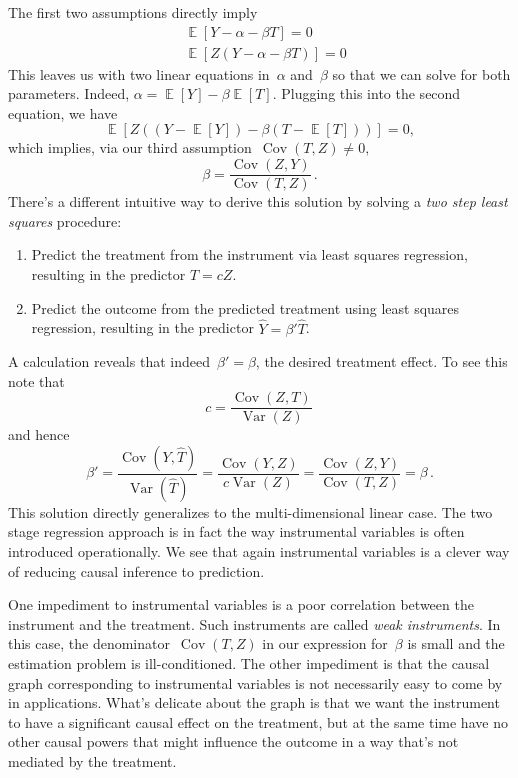 \documentclass{tufte-book}
\begin{document}
The first two assumptions directly imply \[
\begin{aligned}
& \mathop\mathbb{E}[Y-\alpha-\beta T]= 0 \\
& \mathop\mathbb{E}[Z(Y-\alpha-\beta T)] = 0
\end{aligned}
\] This leaves us with two linear equations in~\(\alpha\) and~\(\beta\)
so that we can solve for both parameters. Indeed,
\(\alpha=\mathop\mathbb{E}[Y]-\beta\mathop\mathbb{E}[T]\). Plugging this
into the second equation, we have \[
\mathop\mathbb{E}[Z((Y-\mathop\mathbb{E}[Y])-\beta(T-\mathop\mathbb{E}[T]) )]=0,
\] which implies, via our third
assumption~\(\mathop\mathrm{Cov}(T, Z)\ne 0,\) \[
\beta = \frac{\mathop\mathrm{Cov}(Z, Y)}{\mathop\mathrm{Cov}(T, Z)}\,.
\] There's a different intuitive way to derive this solution by solving
a \emph{two step least squares} procedure:

\begin{enumerate}
\def\labelenumi{\arabic{enumi}.}
\tightlist
\item
  Predict the treatment from the instrument via least squares
  regression, resulting in the predictor \(\hat T = cZ\).
\item
  Predict the outcome from the predicted treatment using least squares
  regression, resulting in the predictor \(\hat Y=\beta' \hat T\).
\end{enumerate}

A calculation reveals that indeed~\(\beta'=\beta\), the desired
treatment effect. To see this note that \[
c=\frac{\mathop\mathrm{Cov}(Z, T)}{\mathop\mathrm{Var}(Z)}\,
\] and hence \[
\beta'
= \frac{\mathop\mathrm{Cov}(Y, \hat T)}{\mathop\mathrm{Var}(\hat T)}
= \frac{\mathop\mathrm{Cov}(Y, Z)}{c\mathop\mathrm{Var}(Z)}
= \frac{\mathop\mathrm{Cov}(Z, Y)}{\mathop\mathrm{Cov}(T, Z)}
= \beta\,.
\] This solution directly generalizes to the multi-dimensional linear
case. The two stage regression approach is in fact the way instrumental
variables is often introduced operationally. We see that again
instrumental variables is a clever way of reducing causal inference to
prediction.

One impediment to instrumental variables is a poor correlation between
the instrument and the treatment. Such instruments are called \emph{weak
instruments}. In this case, the
denominator~\(\mathop\mathrm{Cov}(T, Z)\) in our expression
for~\(\beta\) is small and the estimation problem is ill-conditioned.
The other impediment is that the causal graph corresponding to
instrumental variables is not necessarily easy to come by in
applications. What's delicate about the graph is that we want the
instrument to have a significant causal effect on the treatment, but at
the same time have no other causal powers that might influence the
outcome in a way that's not mediated by the treatment.
\end{document}
